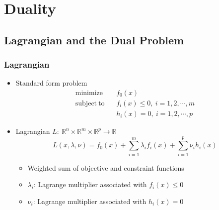 \section{Duality}

\subsection{Lagrangian and the Dual Problem}

\subsubsection*{Lagrangian}
\begin{itemize}
    \item Standard form problem
        $$ \begin{aligned}
            \mathrm{minimize}~~&~~f_0(x) \\
            \mathrm{subject~to}~~&~~f_i(x) \leq 0,~i=1,2,\cdots,m \\
                &~~h_i(x) = 0,~i=1,2,\cdots,p
        \end{aligned} $$
    \item Lagrangian $L:~\mathbb{R}^n\times\mathbb{R}^m\times\mathbb{R}^p\rightarrow\mathbb{R}$
        $$ L(x,\lambda,\nu) = f_0(x) + \sum_{i=1}^m \lambda_i f_i(x) + \sum_{i=1}^p\nu_i h_i(x) $$
    \begin{itemize}
        \item Weighted sum of objective and constraint functions
        \item $\lambda_i$: Lagrange multiplier associated with $f_i(x)\leq 0$
        \item $\nu_i$: Lagrange multiplier associated with $h_i(x)=0$
    \end{itemize}
\end{itemize}

